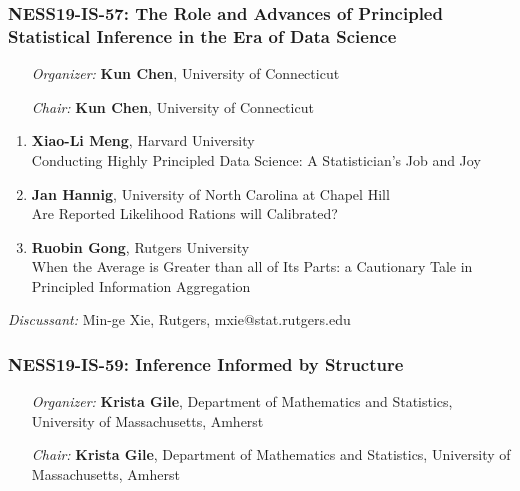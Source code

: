 \subsubsection*{NESS19-IS-57: The Role and Advances of Principled Statistical Inference in the Era of Data Science}

\begin{enumerate}[align=left]
\item [\emph{Organizer:}] \textbf{Kun Chen}, University of Connecticut
\item [\emph{Chair:}] \textbf{Kun Chen}, University of Connecticut
\end{enumerate}

\begin{enumerate}
\item \textbf{Xiao-Li Meng}, Harvard University \\
Conducting Highly Principled Data Science: A Statistician's Job and Joy
\item \textbf{Jan Hannig}, University of North Carolina at Chapel Hill \\
Are Reported Likelihood Rations will Calibrated?
\item \textbf{Ruobin Gong}, Rutgers University \\
When the Average is Greater than all of Its Parts: a Cautionary Tale in Principled Information Aggregation
\end{enumerate}

\emph{Discussant:} Min-ge Xie, Rutgers, mxie@stat.rutgers.edu

\subsubsection*{NESS19-IS-59: Inference Informed by Structure}

\begin{enumerate}[align=left]
\item [\emph{Organizer:}] \textbf{Krista Gile}, Department of Mathematics and Statistics, University of Massachusetts, Amherst
\item [\emph{Chair:}] \textbf{Krista Gile}, Department of Mathematics and Statistics, University of Massachusetts, Amherst
\end{enumerate}

